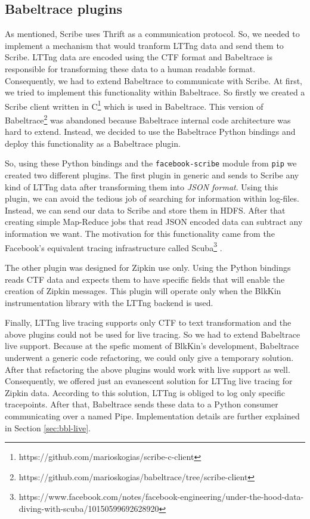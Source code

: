 \subsection{Babeltrace plugins}
As mentioned, Scribe uses Thrift as a communication protocol. So, we needed to
implement a mechanism that would tranform LTTng data and send them to Scribe.
LTTng data are encoded using the CTF format and Babeltrace is responsible for
transforming these data to a human readable format. Consequently, we had to
extend Babeltrace to communicate with Scribe. At first, we tried to implement
this functionality within Babeltrace. So firstly we created a Scribe client
written in C\footnote{https://github.com/marioskogias/scribe-c-client} which is
used in Babeltrace. This version of
Babeltrace\footnote{https://github.com/marioskogias/babeltrace/tree/scribe-client}
was abandoned because Babeltrace internal code architecture was hard to extend.
Instead, we decided to use the Babeltrace Python bindings and deploy this
functionality as a Babeltrace plugin. 

So, using these Python bindings and the \texttt{facebook-scribe} module from
\texttt{pip} we created two different plugins. The first plugin in generic and
sends to Scribe any kind of LTTng data after transforming them into \textit{JSON
format}.  Using this plugin, we can avoid the tedious job of searching for
information within log-files. Instead, we can send our data to Scribe and store
them in HDFS. After that creating simple Map-Reduce jobs that read JSON encoded
data can subtract any information we want. The motivation for this functionality
came from the Facebook's equivalent tracing infrastructure called
Scuba\footnote{https://www.facebook.com/notes/facebook-engineering/under-the-hood-data-diving-with-scuba/10150599692628920}
\cite{scuba}. 

The other plugin was designed for Zipkin use only. Using the Python bindings
reads CTF data and expects them to have specific fields that will enable the
creation of Zipkin messages. This plugin will operate only when the BlkKin
instrumentation library with the LTTng backend is used.

Finally, LTTng live tracing supports only CTF to text transformation and the
above plugins could not be used for live tracing. So we had to extend Babeltrace
live support. Because at the spefic moment of BlkKin's development, Babeltrace
underwent a generic code refactoring, we could only give a temporary solution.
After that refactoring the above plugins would work with live support as well.
Consequently, we offered just an evanescent solution for LTTng live tracing for
Zipkin data. According to this solution, LTTng is obliged to log only specific
tracepoints. After that, Babeltrace sends these data to a Python consumer
communicating over a named Pipe. Implementation details are further explained in
Section \ref{sec:bbl-live}.

